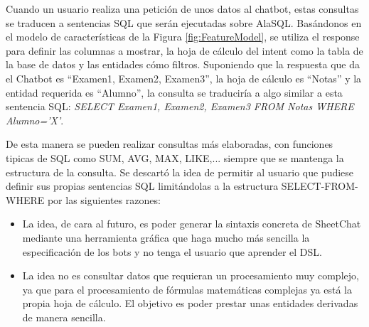 Cuando un usuario realiza una petición de unos datos al chatbot, estas consultas se traducen a sentencias SQL que serán ejecutadas sobre AlaSQL. Basándonos en el modelo de características de la Figura \ref{fig:FeatureModel}, se utiliza el response para definir las columnas a mostrar, la hoja de cálculo del intent como la tabla de la base de datos y las entidades cómo filtros. Suponiendo que la respuesta que da el Chatbot es ``Examen1, Examen2, Examen3'', la hoja de cálculo es ``Notas'' y la entidad requerida es ``Alumno'', la consulta se traduciría a algo similar a esta sentencia SQL: \emph{SELECT Examen1, Examen2, Examen3 FROM Notas WHERE Alumno='X'}.

De esta manera se pueden realizar consultas más elaboradas, con funciones tipicas de SQL como SUM, AVG, MAX, LIKE,... siempre que se mantenga la estructura de la consulta. Se descartó la idea de permitir al usuario que pudiese definir sus propias sentencias SQL limitándolas a la estructura SELECT-FROM-WHERE por las siguientes razones:
\begin{itemize}
	\item La idea, de cara al futuro, es poder generar la sintaxis concreta de SheetChat mediante una herramienta gráfica que haga mucho más sencilla la especificación de los bots y no tenga el usuario que aprender el DSL.
	\item La idea no es consultar datos que requieran un procesamiento muy complejo, ya que para el procesamiento de fórmulas matemáticas complejas ya está la propia hoja de cálculo. El objetivo es poder prestar unas entidades derivadas de manera sencilla.
\end{itemize}